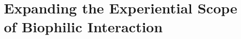 

\chapter{Expanding the Experiential Scope of Biophilic Interaction}
\label{ch:biophilic-futures}

